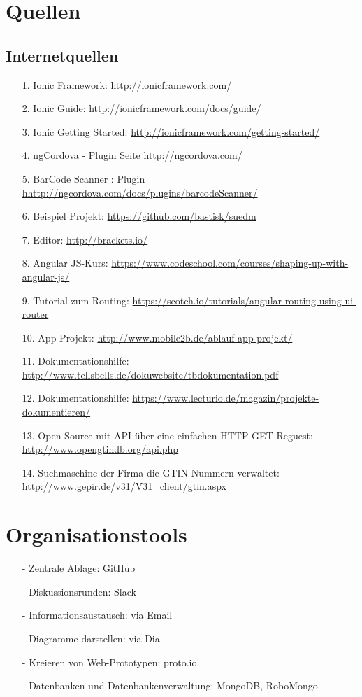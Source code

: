 \documentclass[12pt,a4paper]{article}
\begin{document}
\section*{Quellen}
\subsection*{Internetquellen}
\begin{itemize}
\item[1.]Ionic Framework: \url{http://ionicframework.com/}
\item[2.]Ionic Guide: \url{http://ionicframework.com/docs/guide/}
\item[3.]Ionic Getting Started: \url{http://ionicframework.com/getting-started/}
\item[4.]ngCordova - Plugin Seite \url{http://ngcordova.com/}
\item[5.]BarCode Scanner : Plugin \url{hhttp://ngcordova.com/docs/plugins/barcodeScanner/}
\item[6.]Beispiel Projekt: \url{https://github.com/bastisk/suedm}
\item[7.]Editor: \url{http://brackets.io/}
\item[8.]Angular JS-Kurs: \url{https://www.codeschool.com/courses/shaping-up-with-angular-js/}
\item[9.]Tutorial zum Routing: \url{https://scotch.io/tutorials/angular-routing-using-ui-router}
\item[10.]App-Projekt: \url{http://www.mobile2b.de/ablauf-app-projekt/}
\item[11.] Dokumentationshilfe: \url{http://www.tellsbells.de/dokuwebsite/tbdokumentation.pdf}
\item[12.] Dokumentationshilfe: \url{https://www.lecturio.de/magazin/projekte-dokumentieren/}
\item[13.] Open Source mit API über eine einfachen HTTP-GET-Reguest: \url{http://www.opengtindb.org/api.php}
\item[14.] Suchmaschine der Firma die GTIN-Nummern verwaltet: \url{http://www.gepir.de/v31/V31_client/gtin.aspx}
\end{itemize}
\newpage
\section*{Organisationstools}
\begin{itemize}
\item[-]Zentrale Ablage: GitHub
\item[-]Diskussionsrunden: Slack
\item[-]Informationsaustausch: via Email
\item[-]Diagramme darstellen: via Dia 
\item[-]Kreieren von Web-Prototypen: proto.io
\item[-]Datenbanken und Datenbankenverwaltung: MongoDB, RoboMongo
\end{itemize}
\newpage
\end{document}
